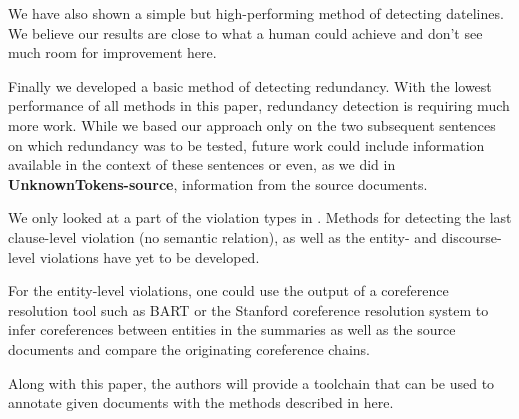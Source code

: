 \documentclass[a4paper,10pt]{scrartcl}
\theoremstyle{style}
\begin{document}
We have also shown a simple but high-performing method of detecting datelines. We believe our results are close to what a human could achieve and don't see much room for improvement here.

Finally we developed a basic method of detecting redundancy. With the lowest performance of all methods in this paper, redundancy detection is requiring much more work. While we based our approach only on the two subsequent sentences on which redundancy was to be tested, future work could include information available in the context of these sentences or even, as we did in \textbf{UnknownTokens-source}, information from the source documents.

We only looked at a part of the violation types in \cite{friedrichlqvsumm}. Methods for detecting the last clause-level violation (no semantic relation), as well as the entity- and discourse-level violations have yet to be developed.

For the entity-level violations, one could use the output of a coreference resolution tool such as BART \citep{versley2008bart} or the Stanford coreference resolution system \citep{lee2011stanford} to infer coreferences between entities in the summaries as well as the source documents and compare the originating coreference chains.

Along with this paper, the authors will provide a toolchain that can be used to annotate given documents with the methods described in here.


\newpage


\end{document}
